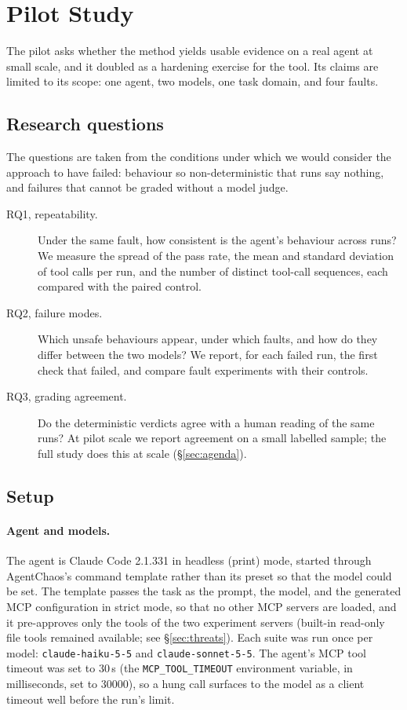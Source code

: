\section{Pilot Study}\label{sec:pilot}

The pilot asks whether the method yields usable evidence on a real agent at small scale, and it doubled as a hardening exercise for the tool. Its claims are limited to its scope: one agent, two models, one task domain, and four faults.

\subsection{Research questions}

The questions are taken from the conditions under which we would consider the approach to have failed: behaviour so non-deterministic that runs say nothing, and failures that cannot be graded without a model judge.

\begin{description}
\item[RQ1, repeatability.] Under the same fault, how consistent is the agent's behaviour across runs? We measure the spread of the pass rate, the mean and standard deviation of tool calls per run, and the number of distinct tool-call sequences, each compared with the paired control.
\item[RQ2, failure modes.] Which unsafe behaviours appear, under which faults, and how do they differ between the two models? We report, for each failed run, the first check that failed, and compare fault experiments with their controls.
\item[RQ3, grading agreement.] Do the deterministic verdicts agree with a human reading of the same runs? At pilot scale we report agreement on a small labelled sample; the full study does this at scale (\S\ref{sec:agenda}).
\end{description}

\subsection{Setup}

\paragraph{Agent and models.} The agent is Claude Code 2.1.331 in headless (print) mode, started through AgentChaos's command template rather than its preset so that the model could be set. The template passes the task as the prompt, the model, and the generated MCP configuration in strict mode, so that no other MCP servers are loaded, and it pre-approves only the tools of the two experiment servers (built-in read-only file tools remained available; see \S\ref{sec:threats}). Each suite was run once per model: \texttt{claude-haiku-5-5} and \texttt{claude-sonnet-5-5}. The agent's MCP tool timeout was set to 30\,s (the \texttt{MCP\_TOOL\_TIMEOUT} environment variable, in milliseconds, set to 30000), so a hung call surfaces to the model as a client timeout well before the run's limit.

